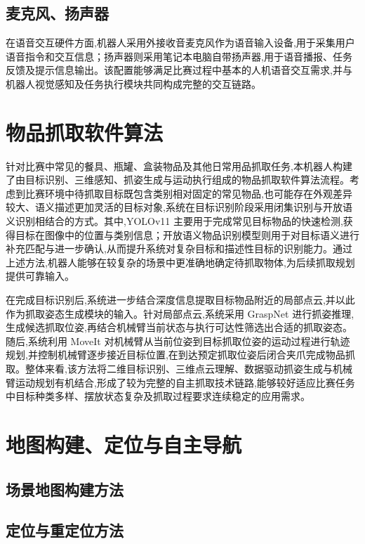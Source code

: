 \documentclass[12pt,hyperref,a4paper,UTF8]{ctexart}
\begin{document}
\subsection{麦克风、扬声器}

在语音交互硬件方面,机器人采用外接收音麦克风作为语音输入设备,用于采集用户语音指令和交互信息；扬声器则采用笔记本电脑自带扬声器,用于语音播报、任务反馈及提示信息输出。该配置能够满足比赛过程中基本的人机语音交互需求,并与机器人视觉感知及任务执行模块共同构成完整的交互链路。


\section{物品抓取软件算法}

针对比赛中常见的餐具、瓶罐、盒装物品及其他日常用品抓取任务,本机器人构建了由目标识别、三维感知、抓姿生成与运动执行组成的物品抓取软件算法流程。考虑到比赛环境中待抓取目标既包含类别相对固定的常见物品,也可能存在外观差异较大、语义描述更加灵活的目标对象,系统在目标识别阶段采用闭集识别与开放语义识别相结合的方式。其中,YOLOv11 主要用于完成常见目标物品的快速检测,获得目标在图像中的位置与类别信息；开放语义物品识别模型则用于对目标语义进行补充匹配与进一步确认,从而提升系统对复杂目标和描述性目标的识别能力。通过上述方法,机器人能够在较复杂的场景中更准确地确定待抓取物体,为后续抓取规划提供可靠输入。

在完成目标识别后,系统进一步结合深度信息提取目标物品附近的局部点云,并以此作为抓取姿态生成模块的输入。针对局部点云,系统采用 GraspNet 进行抓姿推理,生成候选抓取位姿,再结合机械臂当前状态与执行可达性筛选出合适的抓取姿态。随后,系统利用 MoveIt 对机械臂从当前位姿到目标抓取位姿的运动过程进行轨迹规划,并控制机械臂逐步接近目标位置,在到达预定抓取位姿后闭合夹爪完成物品抓取。整体来看,该方法将二维目标识别、三维点云理解、数据驱动抓姿生成与机械臂运动规划有机结合,形成了较为完整的自主抓取技术链路,能够较好适应比赛任务中目标种类多样、摆放状态复杂及抓取过程要求连续稳定的应用需求。
\section{地图构建、定位与自主导航}
\subsection{场景地图构建方法}

\subsection{定位与重定位方法}
\end{document}
